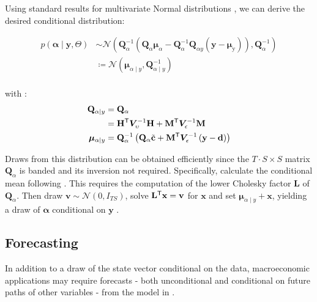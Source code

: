 \documentclass[notitlepage,a4paper,12pt]{article}
\newcommand{\transpose}[1]{{#1}^{\sf{T}}}
\begin{document}
Using standard results for multivariate Normal distributions \citep[e.g.][pp. 86-87]{bishop_prml_2006}, we can derive the desired conditional distribution:

\begin{align*}
    p
    \left(
        \boldsymbol{\alpha} \mid \mathbf{y}, \Theta
     \right) 
    &\sim
    \mathcal{N}
    \left(
    \mathbf{Q}^{-1}_{\alpha} \left( \mathbf{Q}_{\alpha}\boldsymbol{\mu}_{\alpha} - \mathbf{Q}^{-1}_{\alpha} \mathbf{Q}_{\alpha y} \left(\mathbf{y} - \boldsymbol{\mu}_{\text{y}}\right)\right), \mathbf{Q}_{\alpha}^{-1}
    \right) \\
    &\coloneqq \mathcal{N}
        \left(
            \boldsymbol{\mu}_{\alpha\mid y}, \mathbf{Q}_{\alpha\mid y}^{-1}
        \right) \\
\end{align*}

with \citep[see also][eqn. 6-8]{chanjeliazkov_2009}:
\begin{align*}
    \mathbf{Q}_{\alpha\mid y} &= \mathbf{Q}_{\alpha} \\
    &= 
    \transpose{\mathbf{H}} \bm{V}^{-1}_{\upsilon} \mathbf{H} + {\transpose{\mathbf{M}} \bm{V}^{-1}_{\epsilon}\mathbf{M}}\\
    \boldsymbol\mu_{\alpha\mid y} &= \mathbf{Q}_{\alpha}^{-1} \left(\mathbf{Q}_{\alpha} \tilde{\mathbf{c}}+ \transpose{\mathbf{M}} \bm{V}_{\epsilon}^{-1} \left(\mathbf{y} - \mathbf{d}\right) \right)
\end{align*}

Draws from this distribution can be obtained efficiently since the $T\cdot S \times S$ matrix $\mathbf{Q}_{\alpha}$ is banded and its inversion not required. Specifically, calculate the conditional mean following \citet[][Algorithm 2.1]{rueheld_2005}. This requires the computation of the lower Cholesky factor $\mathbf{L}$ of $\mathbf{Q}_{\alpha}$. Then draw $\mathbf{v} \sim \mathcal{N}(0,I_{TS})$, solve $\transpose{\mathbf{L}} \mathbf{x} = \mathbf{v}$ for $\mathbf{x}$ and set $\boldsymbol{\mu}_{\alpha\mid y} +\mathbf{x}$, yielding a draw of $\boldsymbol{\alpha}$ conditional on $\mathbf{y}$ \citep[][Algorithm 2.4]{rueheld_2005}. \\

\subsection{Forecasting}

In addition to a draw of the state vector conditional on the data, macroeconomic applications may require forecasts - both unconditional and conditional on future paths of other variables - from the model in . 
\end{document}
